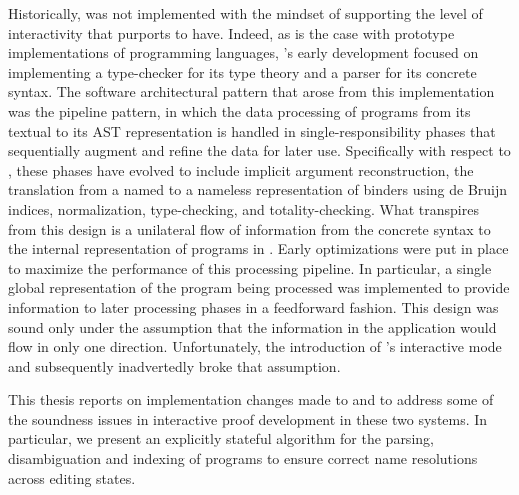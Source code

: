 Historically, \Beluga was not implemented with the mindset of supporting the level of interactivity that \Harpoon purports to have.
Indeed, as is the case with prototype implementations of programming languages, \Beluga's early development focused on implementing a type-checker for its type theory and a parser for its concrete syntax.
The software architectural pattern that arose from this implementation was the pipeline pattern, in which the data processing of programs from its textual to its \ac{AST} representation is handled in single-responsibility phases that sequentially augment and refine the data for later use.
Specifically with respect to \Beluga, these phases have evolved to include implicit argument reconstruction, the translation from a named to a nameless representation of binders using de Bruijn indices, normalization, type-checking, and totality-checking.
What transpires from this design is a unilateral flow of information from the concrete syntax to the internal representation of programs in \Beluga.
Early optimizations were put in place to maximize the performance of this processing pipeline.
In particular, a single global representation of the \Beluga program being processed was implemented to provide information to later processing phases in a feedforward fashion.
This design was sound only under the assumption that the information in the application would flow in only one direction.
Unfortunately, the introduction of \Beluga's interactive mode and subsequently \Harpoon inadvertedly broke that assumption.

This thesis reports on implementation changes made to \Beluga and \Harpoon to address some of the soundness issues in interactive proof development in these two systems.
In particular, we present an explicitly stateful algorithm for the parsing, disambiguation and indexing of \Beluga programs to ensure correct name resolutions across editing states.

